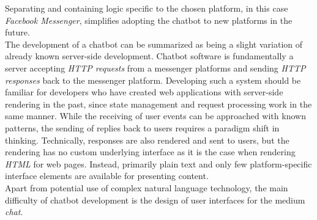 Separating and containing logic specific to the chosen platform, in this case \emph{Facebook Messenger},
simplifies adopting the chatbot to new platforms in the future.
\\
The development of a chatbot can be summarized as being a slight variation of already known server-side development.
Chatbot software is fundamentally a server accepting \emph{HTTP requests} from a messenger platforms and sending \emph{HTTP responses} back to the messenger platform.
Developing such a system should be familiar for developers who have created web applications with server-side rendering in the past,
since state management and request processing work in the same manner.
While the receiving of user events can be approached with known patterns, the sending of replies back to users requires a paradigm shift in thinking.
Technically, responses are also rendered and sent to users,
but the rendering has no custom underlying interface as it is the case when rendering \emph{HTML} for web pages.
Instead, primarily plain text and only few platform-specific interface elements are available for presenting content.
\\
Apart from potential use of complex natural language technology,
the main difficulty of chatbot development is the design of user interfaces for the medium \emph{chat}.
